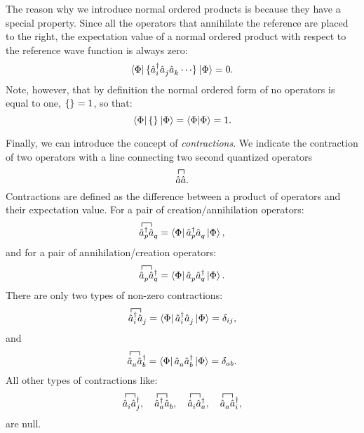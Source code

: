 \documentclass[../Main/chem532-notes.tex]{subfiles}
\begin{document}
The reason why we introduce normal ordered products is because they have a special property. Since all the operators that annihilate the reference are placed to the right, the expectation value of a normal ordered product with respect to the reference wave function is always zero:
\begin{equation}
\bra{\Phi} \{{\hat{a}_{i}^{\dagger}\hat{a}_{j}^{\,}\hat{a}_{k}^{\,}\cdots }\}_{}\ket{\Phi} = 0.
\end{equation}
Note, however, that by definition the normal ordered form of no operators is equal to one, $\{{}\}_{} = 1$, so that:
\begin{equation}
\bra{\Phi} \{{}\}_{}\ket{\Phi} = \braket{\Phi|\Phi}= 1.
\end{equation}

Finally, we can introduce the concept of \textit{contractions}.
We indicate the contraction of two operators with a line connecting two second quantized operators
\begin{equation}
\contraction{}{\hat{a}}{}{\hat{a}}
\hat{a} \hat{a}.
\end{equation}
Contractions are defined as the difference between a product of operators and their expectation value. For a pair of creation/annihilation operators:
\begin{equation}
\contraction{}{\hat{a}}{_{c}}{\hat{a}}
\cop{p}\aop{q}
=
\bra{\Phi}\cop{p}\aop{q}\ket{\Phi},
\end{equation}
and for a pair of annihilation/creation operators:
\begin{equation}
\contraction{}{\hat{a}}{_{c}}{\hat{a}}
\aop{p}\cop{q}
=
\bra{\Phi}\aop{p}\cop{q}\ket{\Phi}.
\end{equation}
There are only two types of non-zero contractions:
\begin{equation}
\contraction{}{\hat{a}}{_{c}}{\hat{a}}
\cop{i}\aop{j}
=
\bra{\Phi}\cop{i}\aop{j}\ket{\Phi} = \delta_{ij},
\end{equation}
and
\begin{equation}
\contraction{}{\hat{a}}{_{c}}{\hat{a}}
\aop{a}\cop{b}
=
\bra{\Phi}\aop{a}\cop{b}\ket{\Phi} = \delta_{ab}.
\end{equation}
All other types of contractions like:
\begin{equation}
\contraction{}{\hat{a}}{_{c}}{\hat{a}}
\aop{i}\cop{j}, \quad
\contraction{}{\hat{a}}{_{c}}{\hat{a}}
\cop{a}\aop{b}, \quad
\contraction{}{\hat{a}}{_{c}}{\hat{a}}
\aop{i}\cop{a}, \quad
\contraction{}{\hat{a}}{_{c}}{\hat{a}}
\aop{a}\cop{i}, 
\end{equation}
are null.
\end{document}
